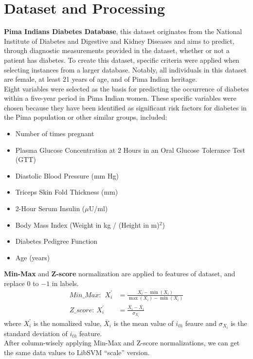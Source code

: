 \documentclass[10pt,twocolumn,letterpaper]{article}
\begin{document}
\section{Dataset and Processing}
\label{sec:dataset}
\textbf{Pima Indians Diabetes Database}, this dataset originates from the National Institute of Diabetes and Digestive and Kidney Diseases and aims to predict, through diagnostic measurements provided in the dataset, whether or not a patient has diabetes. To create this dataset, specific criteria were applied when selecting instances from a larger database. Notably, all individuals in this dataset are female, at least 21 years of age, and of Pima Indian heritage\cite{smith1988using}.\\
\indent Eight variables were selected as the basis for predicting the occurrence of diabetes within a five-year period in Pima Indian women. These specific variables were chosen because they have been identified as significant risk factors for diabetes in the Pima population or other similar groups, included:
\begin{itemize}
	\item Number of times pregnant
	\item Plasma Glucose Concentration at 2 Hours in an Oral Glucose Tolerance Test (GTT)
	\item Diastolic Blood Pressure (mm Hg)
	\item Triceps Skin Fold Thickness (mm)
	\item 2-Hour Serum Insulin ($\mu$U/ml)
	\item Body Mass Index (Weight in kg / (Height in m)$^2$)
	\item Diabetes Pedigree Function
	\item Age (years)
\end{itemize}\leavevmode\newline
\indent \textbf{Min-Max} and \textbf{Z-score} normalization are applied to features of dataset, and replace $0$ to $-1$ in labels.
\begin{equation*}
	\begin{split}
		Min\_Max:\:\ X^{\prime}_i &= \frac{X_i-\min({X_i})}{\max({X_i})-\min({X_i})} \\
		Z\_score:\: X^{\prime}_i &= \frac{X_i-\overline{X_i}}{\sigma_{X_i}}
	\end{split}
\end{equation*}
where $X^{\prime}_i$ is the nomalized value, $\overline{X}_i$ is the mean value of $i_{th}$ feaure and $\sigma_{X_i}$ is the standard deviation of $i_{th}$ feature.\\
\indent After column-wisely applying Min-Max and Z-score normalizations, we can get the same data values to LibSVM ``scale'' version.
\end{document}

